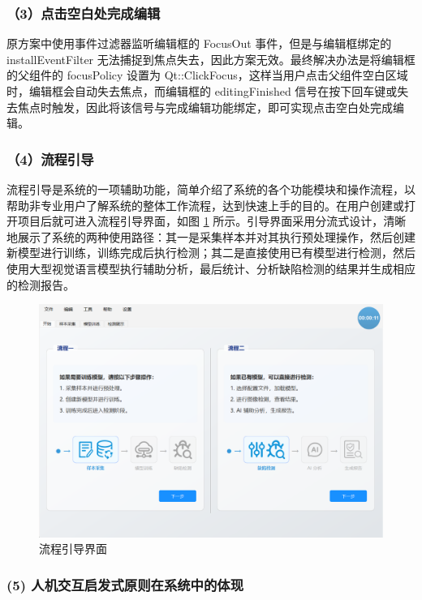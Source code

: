 \documentclass[
  ]{njuthesis}
\begin{document}
\subsubsection{（3）点击空白处完成编辑}

原方案中使用事件过滤器监听编辑框的 FocusOut 事件，但是与编辑框绑定的 installEventFilter 无法捕捉到焦点失去，因此方案无效。最终解决办法是将编辑框的父组件的 focusPolicy 设置为 Qt::ClickFocus，这样当用户点击父组件空白区域时，编辑框会自动失去焦点，而编辑框的 editingFinished 信号在按下回车键或失去焦点时触发，因此将该信号与完成编辑功能绑定，即可实现点击空白处完成编辑。

\subsubsection{（4）流程引导}

流程引导是系统的一项辅助功能，简单介绍了系统的各个功能模块和操作流程，以帮助非专业用户了解系统的整体工作流程，达到快速上手的目的。在用户创建或打开项目后就可进入流程引导界面，如图 \ref{流程引导界面} 所示。引导界面采用分流式设计，清晰地展示了系统的两种使用路径：其一是采集样本并对其执行预处理操作，然后创建新模型进行训练，训练完成后执行检测；其二是直接使用已有模型进行检测，然后使用大型视觉语言模型执行辅助分析，最后统计、分析缺陷检测的结果并生成相应的检测报告。

\begin{figure}[H]
    \centering
    \includegraphics[width=\textwidth]{images/流程引导界面.png}
    \caption{流程引导界面}
    \label{流程引导界面}
\end{figure}

\subsubsection{(5) 人机交互启发式原则在系统中的体现}
\end{document}
